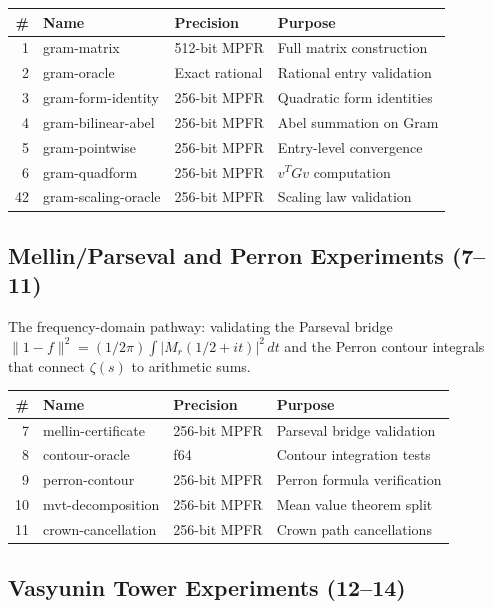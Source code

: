 \documentclass[11pt,a4paper]{article}
\begin{document}
\begin{center}\small
\begin{tabular}{@{}rllp{5cm}@{}}
\toprule
\textbf{\#} & \textbf{Name} & \textbf{Precision} & \textbf{Purpose} \\
\midrule
1 & gram-matrix & 512-bit MPFR & Full matrix construction \\
2 & gram-oracle & Exact rational & Rational entry validation \\
3 & gram-form-identity & 256-bit MPFR & Quadratic form identities \\
4 & gram-bilinear-abel & 256-bit MPFR & Abel summation on Gram \\
5 & gram-pointwise & 256-bit MPFR & Entry-level convergence \\
6 & gram-quadform & 256-bit MPFR & $v^T G v$ computation \\
42 & gram-scaling-oracle & 256-bit MPFR & Scaling law validation \\
\bottomrule
\end{tabular}
\end{center}

\subsection{Mellin/Parseval and Perron Experiments (7--11)}

The frequency-domain pathway: validating the Parseval bridge
$\|1-f\|^2 = (1/2\pi)\int |M_r(1/2+it)|^2\,dt$ and the Perron
contour integrals that connect $\zeta(s)$ to arithmetic sums.

\begin{center}\small
\begin{tabular}{@{}rllp{5cm}@{}}
\toprule
\textbf{\#} & \textbf{Name} & \textbf{Precision} & \textbf{Purpose} \\
\midrule
7 & mellin-certificate & 256-bit MPFR & Parseval bridge validation \\
8 & contour-oracle & f64 & Contour integration tests \\
9 & perron-contour & 256-bit MPFR & Perron formula verification \\
10 & mvt-decomposition & 256-bit MPFR & Mean value theorem split \\
11 & crown-cancellation & 256-bit MPFR & Crown path cancellations \\
\bottomrule
\end{tabular}
\end{center}

\subsection{Vasyunin Tower Experiments (12--14)}
\end{document}
